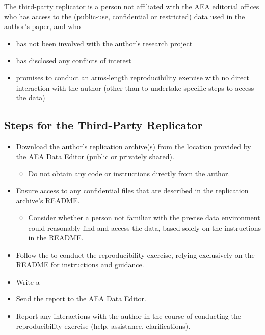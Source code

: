The third-party replicator is a person not affiliated with the AEA
editorial offices who has access to the (public-use, confidential or
restricted) data used in the author's paper, and who

\begin{itemize}
\tightlist
\item
  has not been involved with the author's research project
\item
  has disclosed any conflicts of interest
\item
  promises to conduct an arms-length reproducibility exercise with no
  direct interaction with the author (other than to undertake specific
  steps to access the data)
\end{itemize}

\subsection{Steps for the Third-Party Replicator}\label{steps-for-the-third-party-replicator}

\begin{itemize}
\tightlist
\item
  Download the author's replication archive(s) from the location
  provided by the AEA Data Editor (public or privately shared).

  \begin{itemize}
  \tightlist
  \item
    Do not obtain any code or instructions directly from the author.
  \end{itemize}
\item
  Ensure access to any confidential files that are described in the
  replication archive's README.

  \begin{itemize}
  \tightlist
  \item
    Consider whether a person not familiar with the precise data
    environment could reasonably find and access the data, based solely
    on the instructions in the README.
  \end{itemize}
\item
  Follow the
  to conduct the reproducibility exercise, relying exclusively on the
  README for instructions and guidance.
\item
  Write a
\item
  Send the report to the AEA Data Editor.
\item
  Report any interactions with the author in the course of conducting
  the reproducibility exercise (help, assistance, clarifications).
\end{itemize}

~
